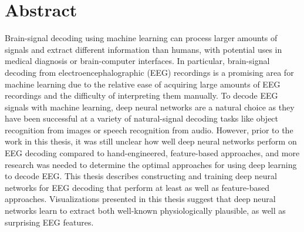 \begingroup
\let\clearpage\relax
\let\cleardoublepage\relax
\let\cleardoublepage\relax

\chapter*{Abstract}
Brain-signal decoding using machine learning can process larger amounts of signals and extract different information than humans, with potential uses in medical diagnosis or brain-computer interfaces. In particular, brain-signal decoding from electroencephalographic (EEG) recordings is a promising area for machine learning due to the relative ease of acquiring large amounts of EEG recordings and the difficulty of interpreting them manually. To decode EEG signals with machine learning, deep neural networks are a natural choice as they have been successful at a variety of natural-signal decoding tasks like object recognition from images or speech recognition from audio. However, prior to the work in this thesis, it was still unclear how well deep neural networks perform on EEG decoding compared to hand-engineered, feature-based approaches, and more research was needed to determine the optimal approaches for using deep learning to decode EEG. This thesis describes constructing and training deep neural networks for EEG decoding that perform at least as well as feature-based approaches. Visualizations presented in this thesis suggest that deep neural networks learn to extract both well-known physiologically plausible, as well as surprising EEG features.

\vfill
\clearpage
\newpage

